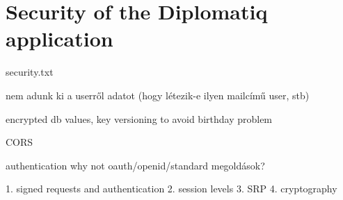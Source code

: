 \chapter{Security of the Diplomatiq application}
\label{chapter:security}

security.txt

nem adunk ki a userről adatot (hogy létezik-e ilyen mailcímű user, stb)

encrypted db values, key versioning to avoid birthday problem

CORS

authentication why not oauth/openid/standard megoldások?

    1. signed requests and authentication
    2. session levels
    3. SRP
    4. cryptography

